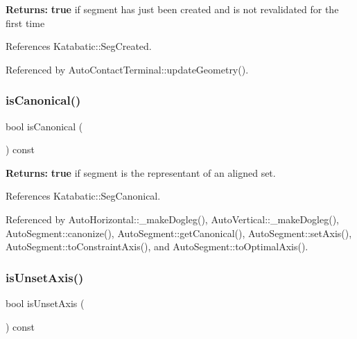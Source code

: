 {\bfseries Returns\+:} {\bfseries true} if segment has just been created and is not revalidated for the first time 

References Katabatic\+::\+Seg\+Created.



Referenced by Auto\+Contact\+Terminal\+::update\+Geometry().

\mbox{\label{classKatabatic_1_1AutoSegment_af6d3008d345195a99e0341f0379c33b7}} 
\subsubsection{\texorpdfstring{is\+Canonical()}{isCanonical()}}
{\footnotesize\ttfamily bool is\+Canonical (\begin{DoxyParamCaption}{ }\end{DoxyParamCaption}) const\hspace{0.3cm}{\ttfamily [inline]}}

{\bfseries Returns\+:} {\bfseries true} if segment is the representant of an aligned set. 

References Katabatic\+::\+Seg\+Canonical.



Referenced by Auto\+Horizontal\+::\+\_\+make\+Dogleg(), Auto\+Vertical\+::\+\_\+make\+Dogleg(), Auto\+Segment\+::canonize(), Auto\+Segment\+::get\+Canonical(), Auto\+Segment\+::set\+Axis(), Auto\+Segment\+::to\+Constraint\+Axis(), and Auto\+Segment\+::to\+Optimal\+Axis().

\mbox{\label{classKatabatic_1_1AutoSegment_a2bd22f431b7cf3695babab78fc3b4c9e}} 
\subsubsection{\texorpdfstring{is\+Unset\+Axis()}{isUnsetAxis()}}
{\footnotesize\ttfamily bool is\+Unset\+Axis (\begin{DoxyParamCaption}{ }\end{DoxyParamCaption}) const\hspace{0.3cm}{\ttfamily [inline]}}

